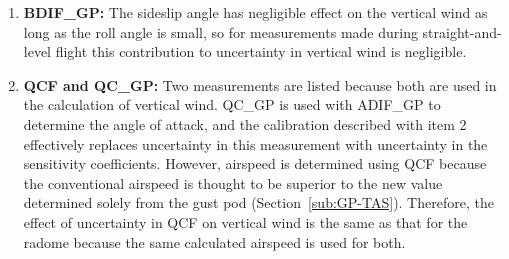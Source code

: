 \documentclass[12pt,twoside,english]{article}\usepackage[]{graphicx}\usepackage[]{color}
\let\OrgIndex\index
\renewcommand*{\index}[1]{\OrgIndex{#1}}
\begin{document}
{{\begin{enumerate}
\item \textbf{BDIF\_GP:} The sideslip angle has negligible effect on the vertical wind as long as the roll angle is small, so for measurements made during straight-and-level flight this contribution to uncertainty in vertical wind is negligible.  
\item \textbf{QCF and QC\_GP:} Two measurements are listed because both are used in the calculation of vertical wind. QC\_GP is used with ADIF\_GP to determine the angle of attack, and the calibration described with item 2 effectively replaces uncertainty in this measurement with uncertainty in the sensitivity coefficients. However, airspeed is determined using QCF because the conventional airspeed is thought to be superior to the new value determined solely from the gust pod (Section~\ref{sub:GP-TAS}). Therefore, the effect of uncertainty in QCF on vertical wind is the same as that for the radome because the same calculated airspeed is used for both.  

\end{enumerate}}}
\end{document}
